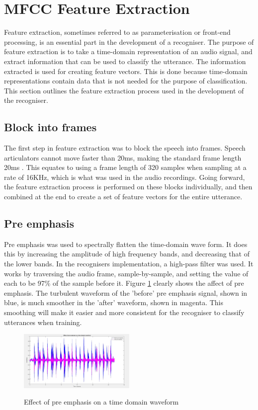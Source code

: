 \documentclass[journal]{IEEEtran}
\begin{document}
\section{MFCC Feature Extraction}
Feature extraction, sometimes referred to as parameterisation or front-end processing, is an essential part in the development of a recogniser. The purpose of feature extraction is to take a time-domain representation of an audio signal, and extract information that can be used to classify the utterance. The information extracted is used for creating feature vectors. This is done because time-domain representations contain data that is not needed for the purpose of classification. This section outlines the feature extraction process used in the development of the recogniser.

\subsection{Block into frames}
The first step in feature extraction was to block the speech into frames. Speech articulators cannot move faster than 20ms, making the standard frame length 20ms \cite{framelength}. This equates to using a frame length of 320 samples when sampling at a rate of 16KHz, which is what was used in the audio recordings. Going forward, the feature extraction process is performed on these blocks individually, and then combined at the end to create a set of feature vectors for the entire utterance.

\subsection{Pre emphasis}
Pre emphasis was used to spectrally flatten the time-domain wave form. It does this by increasing the amplitude of high frequency bands, and decreasing that of the lower bands. In the recognisers implementation, a high-pass filter was used. It works by traversing the audio frame, sample-by-sample, and setting the value of each to be 97\% of the sample before it. Figure \ref{fig:preemphasis1} clearly shows the affect of pre emphasis. The turbulent waveform of the 'before' pre emphasis signal, shown in blue, is much smoother in the 'after' waveform, shown in magenta. This smoothing will make it easier and more consistent for the recogniser to classify utterances when training.

\begin{figure}[!htb]
	\centering
	\captionsetup{justification=centering}
	\includegraphics[width=0.5\textwidth]{pre_both.jpg}\\
	\caption{Effect of pre emphasis on a time domain waveform}\label{fig:preemphasis1}
\end{figure}
\end{document}
